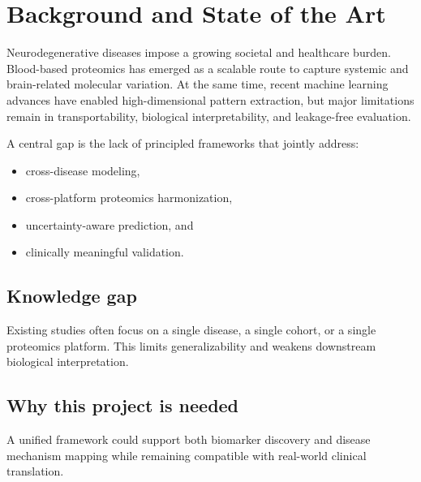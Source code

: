 \section{Background and State of the Art}

Neurodegenerative diseases impose a growing societal and healthcare
burden. Blood-based proteomics has emerged as a scalable route to
capture systemic and brain-related molecular variation. At the same
time, recent machine learning advances have enabled high-dimensional
pattern extraction, but major limitations remain in transportability,
biological interpretability, and leakage-free evaluation.

A central gap is the lack of principled frameworks that jointly address:
\begin{itemize}
  \item cross-disease modeling,
  \item cross-platform proteomics harmonization,
  \item uncertainty-aware prediction, and
  \item clinically meaningful validation.
\end{itemize}

\subsection{Knowledge gap}

Existing studies often focus on a single disease, a single cohort, or a
single proteomics platform. This limits generalizability and weakens
downstream biological interpretation.




\subsection{Why this project is needed}

A unified framework could support both biomarker discovery and disease
mechanism mapping while remaining compatible with real-world clinical
translation.
